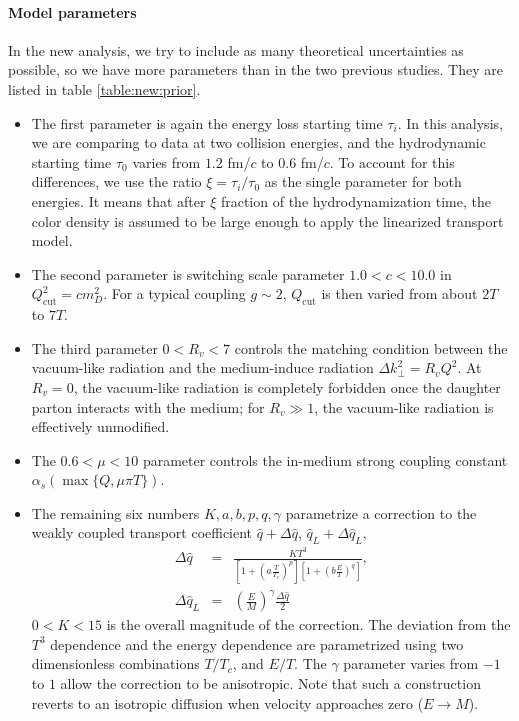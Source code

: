 \paragraph{Model parameters}
In the new analysis, we try to include as many theoretical uncertainties as possible, so we have more parameters than in the two previous studies.
They are listed in table \ref{table:new:prior}.
\begin{itemize}
\item The first parameter is again the energy loss starting time $\tau_i$.
In this analysis, we are comparing to data at two collision energies, and the hydrodynamic starting time $\tau_0$ varies from $1.2$ fm/$c$ to $0.6$ fm/$c$.
To account for this differences, we use the ratio $\xi = \tau_i/\tau_0$ as the single parameter for both energies.
It means that after $\xi$ fraction of the hydrodynamization time, the color density is assumed to be large enough to apply the linearized transport model.
\item The second parameter is switching scale parameter $1.0 < c < 10.0$ in $Q_{\textrm{cut}}^2 = c m_D^2$. For a typical coupling $g\sim 2$, $Q_{\textrm{cut}}$ is then varied from about $2T$ to $7T$.
\item The third parameter $0<R_v<7$ controls the matching condition between the vacuum-like radiation and the medium-induce radiation $\Delta k_\perp^2 = R_v Q^2$.
At $R_v = 0$, the vacuum-like radiation is completely forbidden once the daughter parton interacts with the medium; for $R_v \gg 1$, the vacuum-like radiation is effectively unmodified.
\item The $0.6 < \mu < 10$ parameter controls the in-medium strong coupling constant $\alpha_s(\max\{Q, \mu\pi T\})$.
\item The remaining six numbers $K,a,b,p,q, \gamma$ parametrize a correction to the weakly coupled transport coefficient $\hat{q} + \Delta\hat{q}$, $\hat{q}_L + \Delta\hat{q}_L$,
\begin{eqnarray}
\Delta\hat{q} &=& \frac{K T^3}{\left[1+\left(a\frac{T}{T_c}\right)^p\right]\left[1+\left(b\frac{E}{T}\right)^q\right]}, \\
\Delta\hat{q}_L &=& \left(\frac{E}{M}\right)^\gamma \frac{\Delta\hat{q}}{2}
\end{eqnarray}
$0 < K < 15$ is the overall magnitude of the correction. 
The deviation from the $T^3$ dependence and the energy dependence are parametrized using two dimensionless combinations $T/T_c$, and $E/T$.
The $\gamma$ parameter varies from $-1$ to $1$ allow the correction to be anisotropic.
Note that such a construction reverts to an isotropic diffusion when velocity approaches zero ($E\rightarrow M$).
\end{itemize}

